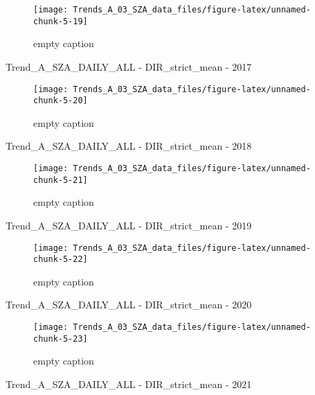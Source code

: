 \documentclass[
  10pt,
  a4paper,oneside]{article}
\begin{document}
\begin{figure}[!ht]

{\centering \texttt{[image: Trends\_A\_03\_SZA\_data\_files/figure-latex/unnamed-chunk-5-19]} 

}

\caption{ empty caption }\label{fig:unnamed-chunk-5-19}
\end{figure}

Trend\_A\_SZA\_DAILY\_ALL - DIR\_strict\_mean - 2017

\begin{figure}[!ht]

{\centering \texttt{[image: Trends\_A\_03\_SZA\_data\_files/figure-latex/unnamed-chunk-5-20]} 

}

\caption{ empty caption }\label{fig:unnamed-chunk-5-20}
\end{figure}

Trend\_A\_SZA\_DAILY\_ALL - DIR\_strict\_mean - 2018

\begin{figure}[!ht]

{\centering \texttt{[image: Trends\_A\_03\_SZA\_data\_files/figure-latex/unnamed-chunk-5-21]} 

}

\caption{ empty caption }\label{fig:unnamed-chunk-5-21}
\end{figure}

Trend\_A\_SZA\_DAILY\_ALL - DIR\_strict\_mean - 2019

\begin{figure}[!ht]

{\centering \texttt{[image: Trends\_A\_03\_SZA\_data\_files/figure-latex/unnamed-chunk-5-22]} 

}

\caption{ empty caption }\label{fig:unnamed-chunk-5-22}
\end{figure}

Trend\_A\_SZA\_DAILY\_ALL - DIR\_strict\_mean - 2020

\begin{figure}[!ht]

{\centering \texttt{[image: Trends\_A\_03\_SZA\_data\_files/figure-latex/unnamed-chunk-5-23]} 

}

\caption{ empty caption }\label{fig:unnamed-chunk-5-23}
\end{figure}

Trend\_A\_SZA\_DAILY\_ALL - DIR\_strict\_mean - 2021
\end{document}
